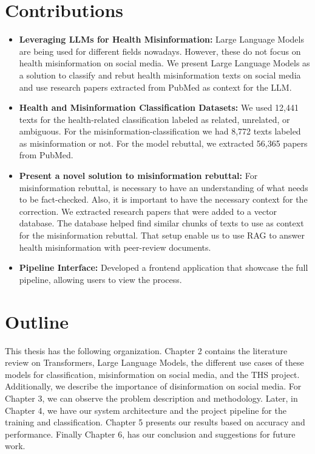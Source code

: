 \section{Contributions}
\noindent
\begin{itemize}
	\item \textbf{Leveraging LLMs for Health Misinformation:} Large Language Models are being used for different fields nowadays. However, these do not focus on health misinformation on social media. We present Large Language Models as a solution
	to classify and rebut health misinformation texts on social media and use research papers extracted from PubMed as context for the LLM.
	\item \textbf{Health and Misinformation Classification Datasets:} We used 12,441 texts for the health-related classification labeled as related, unrelated, or ambiguous. For the misinformation-classification we had 8,772 texts labeled as misinformation or not. For the model rebuttal, we extracted
	56,365 papers from PubMed.
	\item \textbf{Present a novel solution to misinformation rebuttal:} For misinformation rebuttal, is necessary to have an understanding of what needs to be fact-checked. Also, it is important to have the necessary context for the correction. We extracted research papers that were added to a
	vector database. The database helped find similar chunks of texts to use as context for the misinformation rebuttal. That setup enable us to use RAG to answer health misinformation with peer-review documents.
	\item \textbf{Pipeline Interface:} Developed a frontend application that showcase the full pipeline, allowing users to view the process.
	
\end{itemize}

\section{Outline}
\noindent
This thesis has the following organization. Chapter 2 contains the literature review on Transformers, Large Language Models,
the different use cases of these models for classification, misinformation on social media, and the THS project. Additionally, we describe the
importance of disinformation on social media. For Chapter 3, we can observe the problem description and methodology.
 Later, in Chapter 4, we have our system architecture and the project pipeline for the training and classification. Chapter 5 presents our results based on accuracy and performance. Finally Chapter 6, has our conclusion and suggestions for future work.
 
 
 
 
 